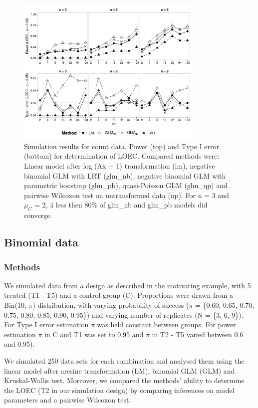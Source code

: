 \documentclass{scrartcl}
\begin{document}
\begin{figure}[h]
  \centering
  \includegraphics[width = 0.8\textwidth]{p_loec_c.pdf}
  \caption{Simulation results for count data. Power (top) and Type I error (bottom) for determination of LOEC. Compared methods were: Linear model after log (Ax + 1) transformation (lm), negative binomial GLM with LRT (glm\_nb), negative binomial GLM with parametric boostrap (glm\_pb), quasi-Poisson GLM (glm\_qp) and pairwise Wilcoxon test on untransformed data (np). For n = 3 and $\mu_C$ = {2, 4} less then 80\% of glm\_nb and glm\_pb models did converge.}
  \label{fig:p_loec_c}
\end{figure}



\subsection{Binomial data}
\subsubsection{Methods}
We simulated data from a design as described in the motivating example, with 5 treated (T1 - T5) and a control group (C). 
Proportions were drawn from a Bin(10, $\pi$) distribution, with varying probability of success ($\pi$ = \{0.60, 0.65, 0.70, 0.75, 0.80, 0.85, 0.90, 0.95\}) and varying number of replicates (N = \{3, 6, 9\}).
For Type I error estimation $\pi$ was held constant between groups.
For power estimation $\pi$ in C and T1 was set to 0.95 and $\pi$ in T2 - T5 varied between 0.6 and 0.95). 
 
We simulated 250 data sets for each combination and analysed them using the linear model after arcsine transformation (LM), binomial GLM (GLM) and Kruskal-Wallis test.
Moreover, we compared the methods' ability to determine the LOEC (T2 in our simulation design) by comparing inferences on model parameters and a pairwise Wilcoxon test. 
\end{document}
